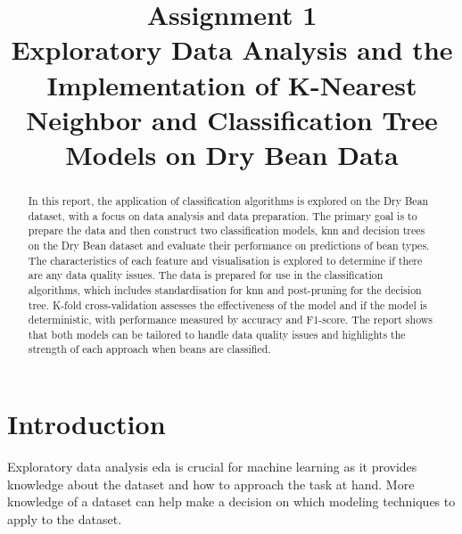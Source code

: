\documentclass[10pt, conference]{IEEEtran}
\begin{document}
\title{Assignment 1 \\
Exploratory Data Analysis and the Implementation of K-Nearest Neighbor and Classification Tree Models
on Dry Bean Data
}

\author{
}

\maketitle

\begin{abstract}
    In this report, the application of classification algorithms is explored on the Dry Bean dataset, with a focus on
    data analysis and data preparation. The primary goal is to prepare the data and then construct two classification models,
    \acrfull{knn} and decision trees on the Dry Bean dataset and evaluate their performance on predictions of bean types.
    The characteristics of each feature and visualisation is explored to determine if there are any data quality issues.
    The data is prepared for use in the classification algorithms, which includes standardisation for \acrshort{knn} and
    post-pruning for the decision tree. K-fold cross-validation assesses the effectiveness of the model and if the
    model is deterministic, with performance measured by accuracy and F1-score. The report shows that both models can be
    tailored  to handle data quality issues and highlights the strength of each approach when beans are classified.
\end{abstract}

\section{Introduction}

Exploratory data analysis \acrshort{eda} is crucial for machine learning as it provides knowledge about the dataset and how to
approach the task at hand. More knowledge of a dataset can help make a decision on which modeling techniques to apply to the
dataset.
\end{document}
